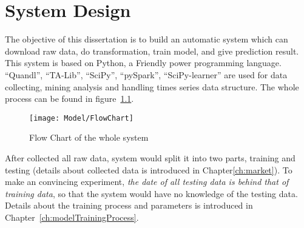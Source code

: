 \chapter{System Design}
\label{ch:system}

The objective of this dissertation is to build an automatic system which can download raw data, do transformation, train model, and give prediction result. This system is based on Python, a Friendly power programming language. “Quandl”, “TA-Lib”, “SciPy”, “pySpark”, “SciPy-learner” are used for data collecting, mining analysis and handling times series data structure. The whole process can be found in figure~\ref{fg:system_model}.
\begin{figure}[h]
	\centering
	\texttt{[image: Model/FlowChart]}
	\caption{Flow Chart of the whole system}
	\label{fg:system_model}
\end{figure}

After collected all raw data, system would split it into two parts, training and testing (details about collected data is introduced in Chapter\ref{ch:market}). To make an convincing experiment, \emph{the date of all testing data is behind that of training data}, so that the system would have no knowledge of the testing data. Details about the training process and parameters is introduced in Chapter~\ref{ch:modelTrainingProcess}.
